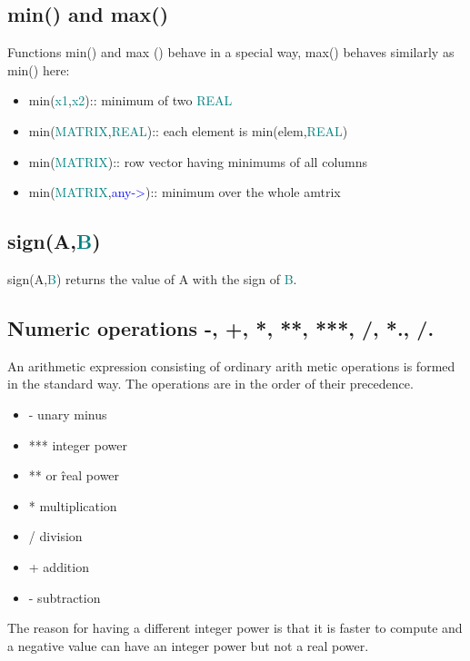{\subsection{\textcolor{VioletRed}{min}() and \textcolor{VioletRed}{max}()} 
\label{minmax} 
Functions \textcolor{VioletRed}{min}() and max () 
behave in a special way, \textcolor{VioletRed}{max}() behaves similarly as \textcolor{VioletRed}{min}() here: 
\begin{itemize} 
\item \textcolor{VioletRed}{min}(\textcolor{teal}{x1},\textcolor{teal}{x2}):: minimum of two \textcolor{teal}{REAL} 
\item \textcolor{VioletRed}{min}(\textcolor{teal}{MATRIX},\textcolor{teal}{REAL}):: each element is \textcolor{VioletRed}{min}(elem,\textcolor{teal}{REAL}) 
\item \textcolor{VioletRed}{min}(\textcolor{teal}{MATRIX}):: row vector having minimums of all columns 
\item \textcolor{VioletRed}{min}(\textcolor{teal}{MATRIX},\textcolor{blue}{any->}):: minimum over the whole amtrix 
\end{itemize} 
\subsection{\textcolor{VioletRed}{sign}(A,\textcolor{teal}{B})} 
\label{sign} 
\textcolor{VioletRed}{sign}(A,\textcolor{teal}{B}) returns the value of A with the sign of \textcolor{teal}{B}. 
\subsection{Numeric operations -, +, *, **, ***, /, *., /.} 
\label{numer} 
An arithmetic expression consisting of ordinary arith metic operations is formed in 
the standard way. The operations are in the order of their precedence. 
\begin{itemize} 
\item - unary minus 
\item *** integer power 
\item ** or \^ real power 
\item * multiplication 
\item / division 
\item + addition 
\item - subtraction 
\end{itemize} 
 
The reason for having a different integer power is that it is faster to compute and a negative 
value can have an integer power but not a real power. 
 
}
